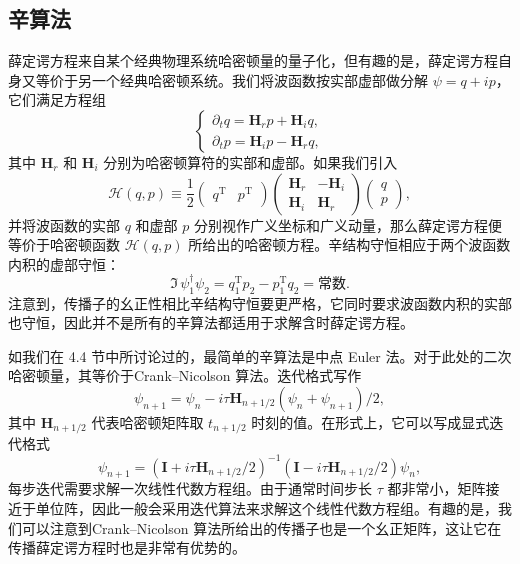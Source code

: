 \subsection{辛算法}

薛定谔方程来自某个经典物理系统哈密顿量的量子化，但有趣的是，薛定谔方程自身又等价于另一个经典哈密顿系统。我们将波函数按实部虚部做分解 $\psi=q+ip$，它们满足方程组
\begin{equation}
 \begin{cases}
 \partial_t q=\mathbf H_r p+\mathbf H_i q,\\
 \partial_t p=\mathbf H_i p-\mathbf H_r q,
 \end{cases}
\tag{6.2.30}
\end{equation}
其中 $\mathbf H_r$ 和 $\mathbf H_i$ 分别为哈密顿算符的实部和虚部。如果我们引入
\begin{equation}
 \mathcal H(q,p)\equiv\frac12
 \begin{pmatrix}q^\mathrm T&p^\mathrm T\end{pmatrix}
 \begin{pmatrix}\mathbf H_r&-\mathbf H_i\\\mathbf H_i&\mathbf H_r\end{pmatrix}
 \begin{pmatrix}q\\p\end{pmatrix},
\tag{6.2.31}
\end{equation}
并将波函数的实部 $q$ 和虚部 $p$ 分别视作广义坐标和广义动量，那么薛定谔方程便等价于哈密顿函数 $\mathcal H(q,p)$ 所给出的哈密顿方程。辛结构守恒相应于两个波函数内积的虚部守恒：
\begin{equation}
 \Im\,\psi_1^\dagger\psi_2=q_1^\mathrm Tp_2-p_1^\mathrm Tq_2=\text{常数}.
\tag{6.2.32}
\end{equation}
注意到，传播子的幺正性相比辛结构守恒要更严格，它同时要求波函数内积的实部也守恒，因此并不是所有的辛算法都适用于求解含时薛定谔方程。

如我们在 4.4 节中所讨论过的，最简单的辛算法是中点 Euler 法。对于此处的二次哈密顿量，其等价于Crank--Nicolson 算法。迭代格式写作
\begin{equation}
 \psi_{n+1}=\psi_n-i\tau\mathbf H_{n+1/2}(\psi_n+\psi_{n+1})/2,
\tag{6.2.33}
\end{equation}
其中 $\mathbf H_{n+1/2}$ 代表哈密顿矩阵取 $t_{n+1/2}$ 时刻的值。在形式上，它可以写成显式迭代格式
\begin{equation}
 \psi_{n+1}=(\mathbf I+i\tau\mathbf H_{n+1/2}/2)^{-1}(\mathbf I-i\tau\mathbf H_{n+1/2}/2)\psi_n,
\tag{6.2.34}
\end{equation}
每步迭代需要求解一次线性代数方程组。由于通常时间步长 $\tau$ 都非常小，矩阵接近于单位阵，因此一般会采用迭代算法来求解这个线性代数方程组。有趣的是，我们可以注意到Crank--Nicolson 算法所给出的传播子也是一个幺正矩阵，这让它在传播薛定谔方程时也是非常有优势的。

